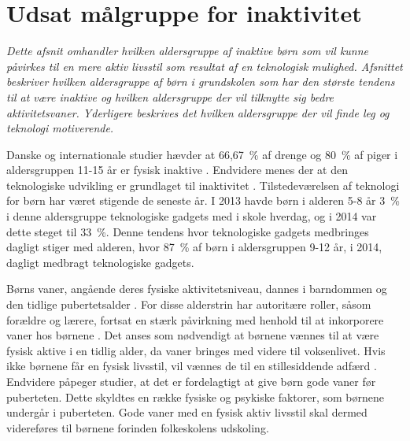 \section {Udsat målgruppe for inaktivitet}
\textit{Dette afsnit omhandler hvilken aldersgruppe af inaktive børn som vil kunne påvirkes til en mere aktiv livsstil som resultat af en teknologisk mulighed. Afsnittet beskriver hvilken aldersgruppe af børn i grundskolen som har den største tendens til at være inaktive og hvilken aldersgruppe der vil tilknytte sig bedre aktivitetsvaner. Yderligere beskrives det hvilken aldersgruppe der vil finde leg og teknologi motiverende.}

Danske og internationale studier hævder at 66,67~\% af drenge og 80~\% af piger i aldersgruppen 11-15 år er fysisk inaktive \citep{SundhedsstyrrelsenFaktaark}. 
Endvidere menes der at den teknologiske udvikling er grundlaget til inaktivitet \citep{Kiens2007}. Tilstedeværelsen af teknologi for børn har været stigende de seneste år. I 2013 havde børn i alderen 5-8 år 3~\% i denne aldersgruppe teknologiske gadgets med i skole hverdag, og i 2014 var dette steget til 33~\%. Denne tendens hvor teknologiske gadgets medbringes dagligt stiger med alderen, hvor 87~\% af børn i aldersgruppen 9-12 år, i 2014, dagligt medbragt teknologiske gadgets. \citep{GjensidigeForsikring2014}

Børns vaner, angående deres fysiske aktivitetsniveau, dannes i barndommen og den tidlige pubertetsalder \citep{F.SallisG.Simons-MortonJ.Stone1992}. For disse alderstrin har autoritære roller, såsom forældre og lærere, fortsat en stærk påvirkning med henhold til at inkorporere vaner hos børnene \citep{L.MeyerP.Gullotta2012}. \newline
Det anses som nødvendigt at børnene vænnes til at være fysisk aktive i en tidlig alder, da vaner bringes med videre til voksenlivet. Hvis ikke børnene får en fysisk livsstil, vil vænnes de til en stillesiddende adfærd \citep{Nabe-NielsenSundhedsministerietetal.2005,P.J.KremersBrug2008,L.MeyerP.Gullotta2012}. Endvidere påpeger studier, at det er fordelagtigt at give børn gode vaner før puberteten. Dette skyldtes en række fysiske og psykiske faktorer, som børnene undergår i puberteten. Gode vaner med en fysisk aktiv livsstil skal dermed videreføres til børnene forinden folkeskolens udskoling. 


